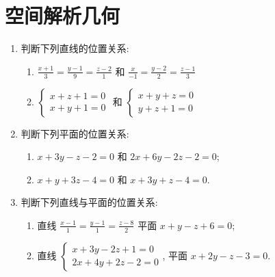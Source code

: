 \section{空间解析几何}
\begin{enumerate}
    \item 判断下列直线的位置关系:
    \begin{enumerate}
        \item $\frac{x+1}{3}=\frac{y-1}{9}=\frac{z-2}{1}$ 和 $\frac{x}{-1}=\frac{y-2}{2}=\frac{z-1}{3}$
        \item 
        $\begin{cases}
            x+z+1=0 \\
            x+y+1=0
        \end{cases}$
        和
        $\begin{cases}
            x+y+z=0 \\
            y+z+1=0
        \end{cases}$
    \end{enumerate}

    \item 判断下列平面的位置关系:
    \begin{enumerate}
        \item $x+3y-z-2=0$ 和 $2x+6y-2z-2=0$;
        \item $x+y+3z-4=0$ 和 $x+3y+z-4=0$.
    \end{enumerate}

    \item 判断下列直线与平面的位置关系:
    \begin{enumerate}
        \item 直线 $\frac{x-1}{1}=\frac{y-1}{1}=\frac{z-8}{2}$ 平面 $x+y-z+6=0$;
        \item 直线
        $\begin{cases}
            x+3y-2z+1=0 \\
            2x+4y+2z-2=0
        \end{cases}$,
        平面 $x+2y-z-3=0$.
    \end{enumerate}


\end{enumerate}
